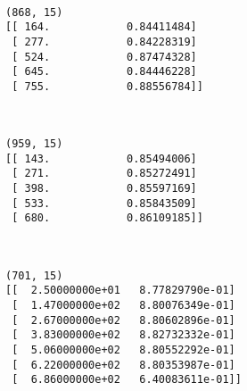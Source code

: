\documentclass{article}
\begin{document}
    \begin{center}
    \end{center}
    { \hspace*{\fill} \\}
    
    \begin{Verbatim}[commandchars=\\\{\}]
(868, 15)
[[ 164.            0.84411484]
 [ 277.            0.84228319]
 [ 524.            0.87474328]
 [ 645.            0.84446228]
 [ 755.            0.88556784]]
    \end{Verbatim}

    \begin{center}
    \end{center}
    { \hspace*{\fill} \\}
    
    \begin{Verbatim}[commandchars=\\\{\}]
(959, 15)
[[ 143.            0.85494006]
 [ 271.            0.85272491]
 [ 398.            0.85597169]
 [ 533.            0.85843509]
 [ 680.            0.86109185]]
    \end{Verbatim}

    \begin{center}
    \end{center}
    { \hspace*{\fill} \\}
    
    \begin{Verbatim}[commandchars=\\\{\}]
(701, 15)
[[  2.50000000e+01   8.77829790e-01]
 [  1.47000000e+02   8.80076349e-01]
 [  2.67000000e+02   8.80602896e-01]
 [  3.83000000e+02   8.82732332e-01]
 [  5.06000000e+02   8.80552292e-01]
 [  6.22000000e+02   8.80353987e-01]
 [  6.86000000e+02   6.40083611e-01]]
    \end{Verbatim}

    \begin{center}
    \end{center}
    { \hspace*{\fill} \\}
    
\end{document}

